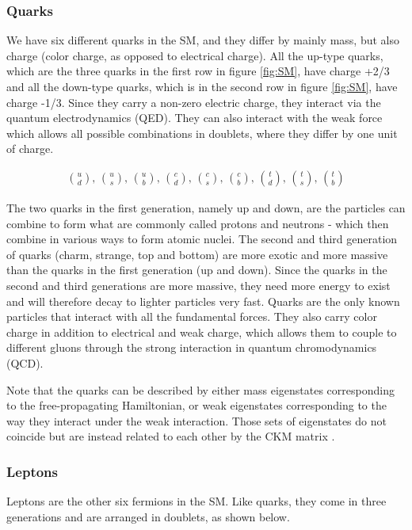 \subsubsection{Quarks}
We have six different quarks \cite{thomson} in the SM, and they differ by mainly mass, but also charge (color charge, as opposed to electrical charge). All the up-type quarks, which are the three quarks in the first row in figure \ref{fig:SM}, have charge +2/3 and all the down-type quarks, which is in the second row in figure \ref{fig:SM}, have charge -1/3. Since they carry a non-zero electric charge, they interact via the quantum electrodynamics (QED). They can also interact with the weak force which allows all possible combinations in doublets, where they differ by one unit of charge. 

\begin{align}
    \binom{u}{d} \text{,  } \binom{u}{s} \text{,  } \binom{u}{b} \text{,  } \binom{c}{d} \text{,  } \binom{c}{s} \text{,  } \binom{c}{b} \text{,  } \binom{t}{d} \text{,  } \binom{t}{s} \text{,  } \binom{t}{b}
\end{align}

The two quarks in the first generation, namely up and down, are the particles can combine to form what are commonly called protons and neutrons - which then combine in various ways to form atomic nuclei. The second and third generation of quarks (charm, strange, top and bottom) are more exotic and more massive than the quarks in the first generation (up and down). Since the quarks in the second and third generations are more massive, they need more energy to exist and will therefore decay to lighter particles very fast. Quarks are the only known particles that interact with all the fundamental forces. They also carry color charge in addition to electrical and weak charge, which allows them to couple to different gluons through the strong interaction in quantum chromodynamics (QCD). 

Note that the quarks can be described by either mass eigenstates corresponding to the free-propagating Hamiltonian, or weak eigenstates corresponding to the way they interact under the weak interaction. Those sets of eigenstates do not coincide but are instead related to each other by the CKM matrix \cite{thomson}. 




\subsubsection{Leptons}
Leptons \cite{thomson} are the other six fermions in the SM. Like quarks, they come in three generations and are arranged in doublets, as shown below.

